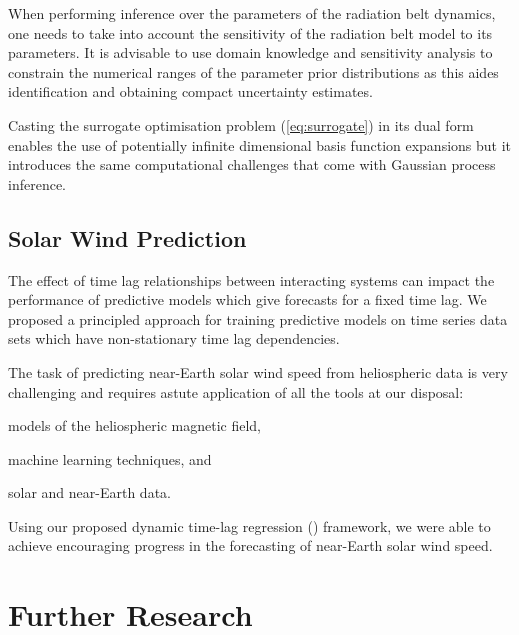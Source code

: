 When performing inference over the parameters of the radiation belt dynamics, 
one needs to take into account the sensitivity of the radiation belt model to 
its parameters. It is advisable to use domain knowledge and sensitivity 
analysis to constrain the numerical ranges of the parameter prior distributions 
as this aides identification and obtaining compact uncertainty estimates.

Casting the surrogate optimisation problem (\cref{eq:surrogate}) in its dual 
form enables the use of potentially infinite dimensional basis function 
expansions but it introduces the same computational challenges that come with 
Gaussian process inference. 

\subsection*{Solar Wind Prediction}

The effect of time lag relationships between interacting systems can impact the 
performance of predictive models which give forecasts for a fixed time lag. We 
proposed a principled approach for training predictive models on time series 
data sets which have non-stationary time lag dependencies.

The task of predicting near-Earth solar wind speed from heliospheric data is 
very challenging and requires astute application of all the tools at our 
disposal: 
\begin{enumerate*} 
    \item models of the heliospheric magnetic field,
    \item machine learning techniques, and 
    \item solar and near-Earth data. 
\end{enumerate*}
Using our proposed dynamic time-lag regression (\XX) framework, we were able to 
achieve encouraging progress in the forecasting of near-Earth solar wind speed.


\section{Further Research}


